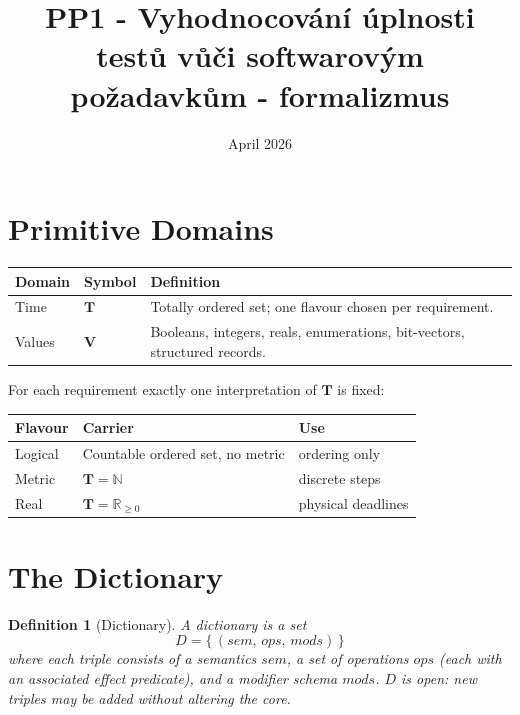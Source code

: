 \documentclass{article}
\title{PP1 - Vyhodnocování úplnosti testů vůči softwarovým požadavkům - formalizmus}
\author{ }
\date{April 2026}
\newtheorem{definition}{Definition}
\begin{document}
\maketitle

\section{Primitive Domains}

\begin{tabularx}{\textwidth}{llX}
    \toprule
    \textbf{Domain} & \textbf{Symbol} & \textbf{Definition}                                                       \\
    \midrule
    Time            & $\mathbf{T}$    & Totally ordered set; one flavour chosen per requirement.                  \\
    Values          & $\mathbf{V}$    & Booleans, integers, reals, enumerations, bit-vectors, structured records. \\
    \bottomrule
\end{tabularx}

\medskip
For each requirement exactly one interpretation of $\mathbf{T}$ is fixed:

\begin{tabularx}{\textwidth}{llX}
    \toprule
    \textbf{Flavour} & \textbf{Carrier}                   & \textbf{Use}       \\
    \midrule
    Logical          & Countable ordered set, no metric   & ordering only      \\
    Metric           & $\mathbf{T} = \mathbb{N}$          & discrete steps     \\
    Real             & $\mathbf{T} = \mathbb{R}_{\geq 0}$ & physical deadlines \\
    \bottomrule
\end{tabularx}

\section{The Dictionary}

\begin{definition}[Dictionary]
    A \emph{dictionary} is a set
    \[
        D = \bigl\{\, (\mathit{sem},\, \mathit{ops},\, \mathit{mods}) \,\bigr\}
    \]
    where each triple consists of a semantics $\mathit{sem}$, a set of operations $\mathit{ops}$ (each with an associated effect predicate), and a modifier schema $\mathit{mods}$. $D$ is open: new triples may be added without altering the core.
\end{definition}
\end{document}
